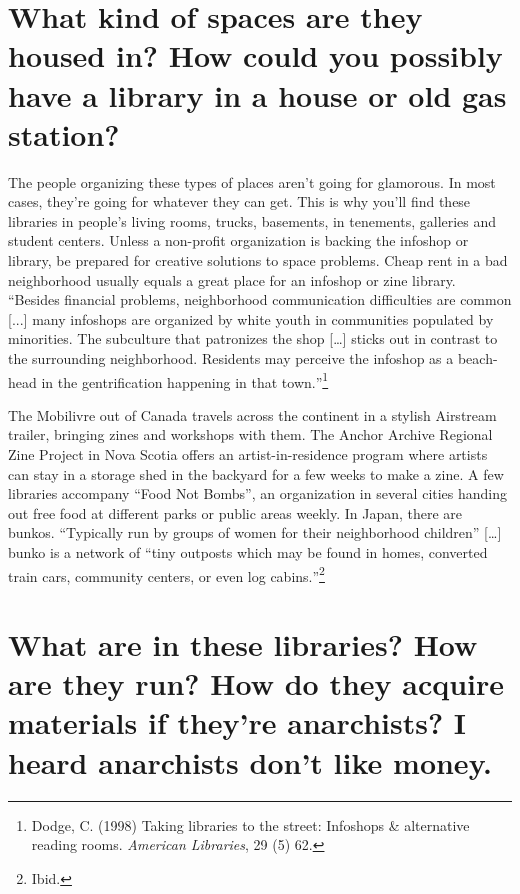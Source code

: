 \documentclass[output=paper]{langscibook}
\begin{document}
\hypertarget{what-kind-of-spaces-are-they-housed-in-how-could-you-possibly-have-a-library-in-a-house-or-old-gas-station}{%
\section*{What kind of spaces are they housed in? How could you possibly
have a library in a house or old gas
station?}\label{what-kind-of-spaces-are-they-housed-in-how-could-you-possibly-have-a-library-in-a-house-or-old-gas-station}}

The people organizing these types of places aren't going for glamorous.
In most cases, they're going for whatever they can get. This is why
you'll find these libraries in people's living rooms, trucks, basements,
in tenements, galleries and student centers. Unless a non-profit
organization is backing the infoshop or library, be prepared for
creative solutions to space problems. Cheap rent in a bad neighborhood
usually equals a great place for an infoshop or zine library.
\foreignquote{english}{Besides financial problems, neighborhood communication
difficulties are common {[}...{]} many infoshops are organized by white
youth in communities populated by minorities. The subculture that
patronizes the shop {[}\ldots{]} sticks out in contrast to the
surrounding neighborhood. Residents may perceive the infoshop as a
beach-head in the gentrification happening in that town.}\footnote{Dodge,
  C. (1998) Taking libraries to the street: Infoshops \& alternative
  reading rooms. \emph{American Libraries}, 29 (5) 62.}

The Mobilivre out of Canada travels across the continent in a stylish
Airstream trailer, bringing zines and workshops with them. The Anchor
Archive Regional Zine Project in Nova Scotia offers an
artist-in-residence program where artists can stay in a storage shed in
the backyard for a few weeks to make a zine. A few libraries accompany
\foreignquote{english}{Food Not Bombs}, an organization in several cities handing out
free food at different parks or public areas weekly. In Japan, there are
bunkos. \foreignquote{english}{Typically run by groups of women for their neighborhood
children} {[}\ldots{]} bunko is a network of \foreignquote{english}{tiny outposts
which may be found in homes, converted train cars, community centers, or
even log cabins.}\footnote{Ibid.}

\hypertarget{what-are-in-these-libraries-how-are-they-run-how-do-they-acquire-materials-if-theyre-anarchists-i-heard-anarchists-dont-like-money.}{%
\section*{What are in these libraries? How are they run? How do they
acquire materials if they're anarchists? I heard anarchists don't like
money.}\label{what-are-in-these-libraries-how-are-they-run-how-do-they-acquire-materials-if-theyre-anarchists-i-heard-anarchists-dont-like-money.}}
\end{document}

